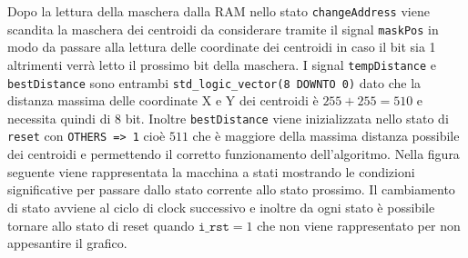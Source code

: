 \documentclass{article}
\begin{document}
\newline 
Dopo la lettura della maschera dalla RAM nello stato \texttt{changeAddress} viene scandita la maschera dei centroidi da considerare tramite il signal \texttt{maskPos} in modo da passare alla lettura delle coordinate dei centroidi in caso il bit sia 1 altrimenti verr\`{a} letto il prossimo bit della maschera.
\newline
I signal \texttt{tempDistance} e \texttt{bestDistance} sono entrambi \texttt{std\_logic\_vector(8 DOWNTO 0)} dato che la distanza massima delle coordinate X e Y dei centroidi \`{e} $255+255=510$ e necessita quindi di 8 bit. Inoltre \texttt{bestDistance} viene inizializzata nello stato di \texttt{reset} con \texttt{OTHERS => \textsc{}1\textsc{}} cio\`{e} $511$ che \`{e} maggiore della massima distanza possibile dei centroidi e permettendo il corretto funzionamento dell'algoritmo.
\newline
Nella figura seguente viene rappresentata la macchina a stati mostrando le condizioni significative per passare dallo stato corrente allo stato prossimo. Il cambiamento di stato avviene al ciclo di clock successivo e inoltre da ogni stato è possibile tornare allo stato di reset quando $\texttt{i\_rst}=1$ che non viene rappresentato per non appesantire il grafico.
\pagebreak


 
\pagebreak
\end{document}
